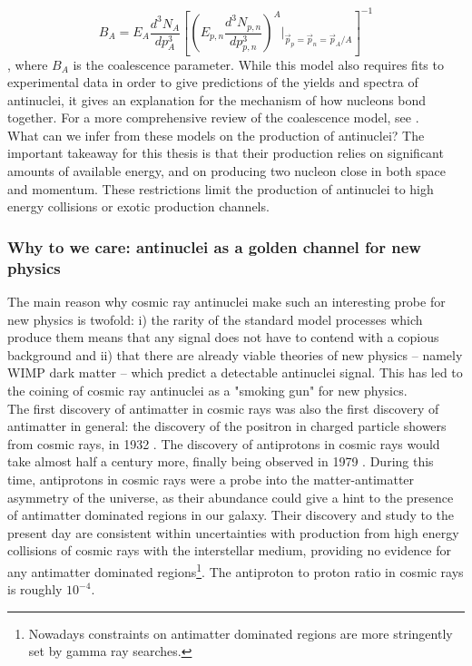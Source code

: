 \begin{equation}\label{eq:CoalescenceParameter}
    B_A = E_A \frac{d^3 N_A}{dp^3_A} \left[ \left( E_{p,n} \frac{d^3 N_{p,n}}{dp^3_{p,n}} \right)^A |_{\vec{p}_p=\vec{p}_n=\vec{p}_A/A } \right]^{-1}
\end{equation}
, where $B_A$ is the coalescence parameter. While this model also requires fits to experimental data in order to give predictions of the yields and spectra of antinuclei, it gives an explanation for the mechanism of how nucleons bond together. For a more comprehensive review of the coalescence model, see \cite{Kachelriess:2020uoh, Coalescence2015}.\\

What can we infer from these models on the production of antinuclei? The important takeaway for this thesis is that their production relies on significant amounts of available energy, and on producing two nucleon close in both space and momentum. These restrictions limit the production of antinuclei to high energy collisions or exotic production channels.

\subsubsection{ Why to we care: antinuclei as a golden channel for new physics}\label{sec:Intro:AntinucleiGoldenChannel}
The main reason why cosmic ray antinuclei make such an interesting probe for new physics is twofold: i) the rarity of the standard model processes which produce them means that any signal does not have to contend with a copious background and ii) that there are already viable theories of new physics -- namely WIMP dark matter -- which predict a detectable antinuclei signal. This has led to the coining of cosmic ray antinuclei as a "smoking gun" for new physics. \\

The first discovery of antimatter in cosmic rays was also the first discovery of antimatter in general: the discovery of the positron in charged particle showers from cosmic rays, in 1932 \cite{positron_discovery}. The discovery of antiprotons in cosmic rays would take almost half a century more, finally being observed in 1979 \cite{antiproton_CR_discovery, Bogomolov:1979hu}. During this time, antiprotons in cosmic rays were a probe into the matter-antimatter asymmetry of the universe, as their abundance could give a hint to the presence of antimatter dominated regions in our galaxy. Their discovery and study to the present day are consistent within uncertainties with production from high energy collisions of cosmic rays with the interstellar medium, providing no evidence for any antimatter dominated regions\footnote{Nowadays constraints on antimatter dominated regions are more stringently set by gamma ray searches.}. The antiproton to proton ratio in cosmic rays is roughly $10^{-4}$. \\

